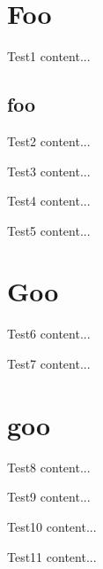 \documentclass[compress]{beamer}
\begin{document}
\section{Foo}
\begin{frame}{Test1}
content...
\end{frame}
\subsection{foo}
\begin{frame}{Test2}
content...
\end{frame}
\begin{frame}{Test3}
content...
\end{frame}
\begin{frame}{Test4}
content...
\end{frame}
\begin{frame}{Test5}
content...
\end{frame}\section{Goo}
\begin{frame}{Test6}
content...
\end{frame}
\begin{frame}{Test7}
content...
\end{frame}
\section{goo}
\begin{frame}{Test8}
content...
\end{frame}
\begin{frame}{Test9}
content...
\end{frame}
\begin{frame}{Test10}
content...
\end{frame}
\begin{frame}{Test11}
content...
\end{frame}
\end{document}
